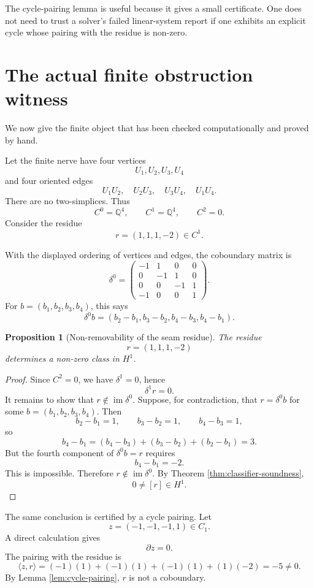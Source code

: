 \documentclass[11pt]{article}
\newtheorem{proposition}[theorem]{Proposition}
\newcommand{\im}{\operatorname{im}}
\newcommand{\Q}{\mathbb{Q}}
\begin{document}
The cycle-pairing lemma is useful because it gives a small certificate. One does not need to trust a solver's failed linear-system report if one exhibits an explicit cycle whose pairing with the residue is non-zero.

\section{The actual finite obstruction witness}\label{sec:actual-witness}

We now give the finite object that has been checked computationally and proved by hand.

Let the finite nerve have four vertices
\[
U_1,U_2,U_3,U_4
\]
and four oriented edges
\[
U_1U_2,
\quad
U_2U_3,
\quad
U_3U_4,
\quad
U_1U_4.
\]
There are no two-simplices. Thus
\[
C^0=\Q^4,
\qquad
C^1=\Q^4,
\qquad
C^2=0.
\]
Consider the residue
\[
r=(1,1,1,-2)\in C^1.
\]

With the displayed ordering of vertices and edges, the coboundary matrix is
\[
\delta^0=
\begin{pmatrix}
-1&1&0&0\\
0&-1&1&0\\
0&0&-1&1\\
-1&0&0&1
\end{pmatrix}.
\]
For \(b=(b_1,b_2,b_3,b_4)\), this says
\[
\delta^0b=(b_2-b_1,b_3-b_2,b_4-b_3,b_4-b_1).
\]

\begin{proposition}[Non-removability of the seam residue]\label{prop:nonremovable}
The residue
\[
r=(1,1,1,-2)
\]
determines a non-zero class in \(H^1\).
\end{proposition}

\begin{proof}
Since \(C^2=0\), we have \(\delta^1=0\), hence
\[
\delta^1r=0.
\]
It remains to show that \(r\notin \im\delta^0\). Suppose, for contradiction, that \(r=\delta^0b\) for some \(b=(b_1,b_2,b_3,b_4)\). Then
\[
b_2-b_1=1,
\qquad
b_3-b_2=1,
\qquad
b_4-b_3=1,
\]
so
\[
b_4-b_1
=(b_4-b_3)+(b_3-b_2)+(b_2-b_1)
=3.
\]
But the fourth component of \(\delta^0b=r\) requires
\[
b_4-b_1=-2.
\]
This is impossible. Therefore \(r\notin \im\delta^0\). By Theorem \ref{thm:classifier-soundness},
\[
0\neq [r]\in H^1.
\]
\end{proof}

The same conclusion is certified by a cycle pairing. Let
\[
z=(-1,-1,-1,1)\in C_1.
\]
A direct calculation gives
\[
\partial z=0.
\]
The pairing with the residue is
\[
\langle z,r\rangle
=(-1)(1)+(-1)(1)+(-1)(1)+(1)(-2)
=-5\neq 0.
\]
By Lemma \ref{lem:cycle-pairing}, \(r\) is not a coboundary.
\end{document}
